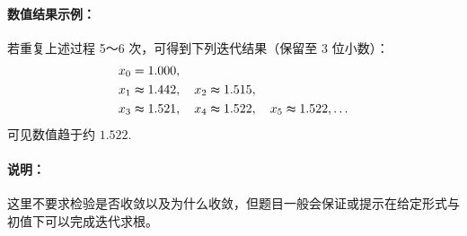 \documentclass[8pt,a4paper,twoside]{tau-class/tau}
\begin{document}
\paragraph{数值结果示例：}
若重复上述过程 5～6 次，可得到下列迭代结果（保留至 3 位小数）：
\[
\begin{aligned}
&x_0 = 1.000, \\
&x_1 \thickapprox 1.442,\quad x_2 \thickapprox 1.515, \\
&x_3 \thickapprox 1.521,\quad x_4 \thickapprox 1.522,\quad x_5 \thickapprox 1.522,\dots
\end{aligned}
\]
可见数值趋于约 \(1.522\).

\paragraph{说明：}
这里不要求检验是否收敛以及为什么收敛，但题目一般会保证或提示在给定形式与初值下可以完成迭代求根。
\end{document}

